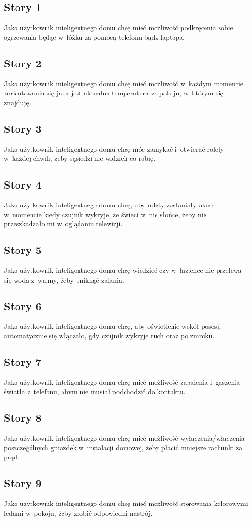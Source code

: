 	\subsection{Story 1}
	 Jako użytkownik inteligentnego domu chcę mieć możliwość podkręcenia sobie ogrzewania będąc w~łóżku za pomocą telefonu bądź laptopa.
	
	\subsection{Story 2}
	Jako użytkownik inteligentnego domu chcę mieć możliwość w~każdym momencie zorientowania się jaka jest aktualna temperatura w~pokoju, w~którym się znajduję.
	
	\subsection{Story 3}
	Jako użytkownik inteligentnego domu chcę móc zamykać i~otwierać rolety w~każdej chwili, żeby sąsiedzi nie widzieli co robię.
	
	\subsection{Story 4} 
	Jako użytkownik inteligentnego domu chcę, aby rolety zasłaniały okno w~momencie kiedy czujnik wykryje, że świeci w~nie słońce, żeby nie przeszkadzało mi w~oglądaniu telewizji.
	
	\subsection{Story 5}
	Jako użytkownik inteligentnego domu chcę wiedzieć czy w~łazience nie przelewa się woda z~wanny, żeby uniknąć zalania. 
	
	\subsection{Story 6}
	Jako użytkownik inteligentnego domu chcę, aby oświetlenie wokół posesji automatycznie się włączało, gdy czujnik wykryje ruch oraz po zmroku.
	
	\subsection{Story 7}
	Jako użytkownik inteligentnego domu chcę mieć możliwość zapalenia i~gaszenia światła z~telefonu, abym nie musiał podchodzić do kontaktu.
	
	\subsection{Story 8}
	Jako użytkownik inteligentnego domu chcę mieć możliwość wyłączenia/włączenia poszczególnych gniazdek w~instalacji domowej, żeby płacić mniejsze rachunki za prąd.
	
	\subsection{Story 9}
	Jako użytkownik inteligentnego domu chcę mieć możliwość sterowania kolorowymi ledami w~pokoju, żeby zrobić odpowiedni nastrój.
	
	

